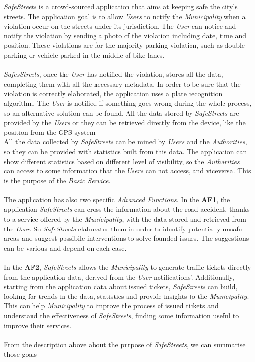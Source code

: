 \documentclass {article}
\begin{document}
	{\it SafeStreets} is a crowd-sourced application that aims at keeping safe the city's streets. The application goal is to allow {\it Users} to notify the {\it Municipality} when a violation occur on the streets under its jurisdiction. The {\it User} can notice and notify the violation by sending a photo of the violation including date, time and position. These violations are for the majority parking violation, such as double parking or vehicle parked in the middle of bike lanes. \\ \\
	{\it SafesStreets}, once the {\it User} has notified the violation, stores all the data, completing them with all the necessary metadata. In order to be sure that the violation is correctly elaborated, the application uses a plate recognition algorithm. The {\it User} is notified if something goes wrong during the whole process, so an alternative solution can be found. All the data stored by {\it SafeStreets} are provided by the {\it Users} or they can be retrieved directly from the device, like the position from the GPS system.\\
	All the data collected by {\it SafeStreets} can be mined by {\it Users} and the {\it Authorities}, so they can be provided with statistics built from this data. The application can show different statistics based on different level of visibility, so the {\it Authorities} can access to some information that the {\it Users} can not access, and viceversa. This is the purpose of the {\it Basic Service}. \\ \\
	The application has also two specific {\it Advanced Functions}. In the {\bf AF1}, the application {\it SafeStreets} can cross the information about the road accident, thanks to a service offered by the {\it Municipality}, with the data stored and retrieved from the {\it User}. So {\it SafeStreets } elaborates them in order to identify potentially unsafe areas and suggest possibile interventions to solve founded issues. The suggestions can be various and depend on each case. \\ \\
	In the   {\bf AF2}, {\it SafeStreets} allows the {\it Municipality} to generate traffic tickets directly from the application data, derived from the {\it User} notifications'. Additionally, starting from the application data about issued tickets, {\it SafeStreets} can build, looking for trends in the data, statistics and provide insights to the {\it Municipality}. This can help {\it Municipality} to improve the process of issued tickets and understand the effectiveness of {\it SafeStreets}, finding some information useful to improve their services. \\ \\
	From the description above about the purpose of {\it SafeStreets}, we can summarise those goals
		
\end{document}
